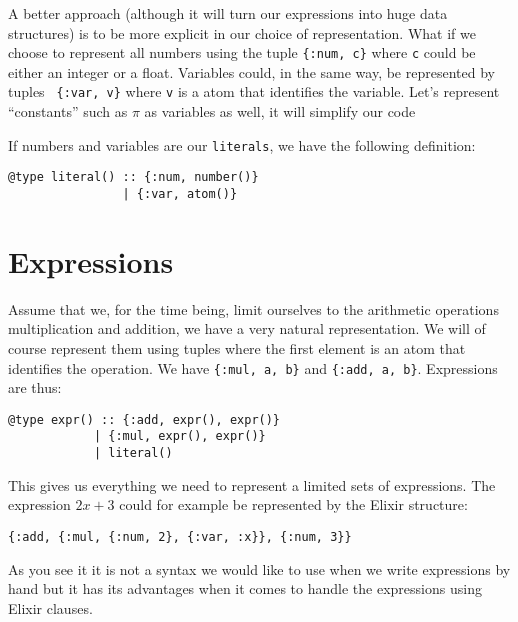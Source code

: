 \documentclass[a4paper,11pt]{article}
\begin{document}
A better approach (although it will turn our expressions into huge
data structures) is to be more explicit in our choice of
representation. What if we choose to represent all numbers using the
tuple {\tt\{:num, c\}} where {\tt c} could be either an integer or a
float. Variables could, in the same way, be represented by tuples {\tt
  \{:var, v\}} where {\tt v} is a atom that identifies the
variable. Let's represent ``constants'' such as $\pi$ as variables as
well, it will simplify our code

If numbers and variables are our {\tt literals}, we have the
following definition:

\begin{verbatim}
@type literal() :: {:num, number()} 
                | {:var, atom()}
\end{verbatim}



\section{Expressions}

Assume that we, for the time being, limit ourselves to the arithmetic
operations multiplication and addition, we have a very natural
representation. We will of course represent them using tuples where
the first element is an atom that identifies the operation. We have
{\tt\{:mul, a, b\}} and {\tt \{:add, a, b\}}. Expressions are thus:

\begin{verbatim}
@type expr() :: {:add, expr(), expr()} 
            | {:mul, expr(), expr()} 
            | literal()
\end{verbatim}

This gives us everything we need to represent a limited sets of
expressions. The expression $2x + 3$ could for example be represented
by the Elixir structure:

\begin{verbatim}
{:add, {:mul, {:num, 2}, {:var, :x}}, {:num, 3}}
\end{verbatim}

\noindent As you see it it is not a syntax we would like to use when we write
expressions by hand but it has its advantages when it comes to handle
the expressions using Elixir clauses. 


\end{document}

